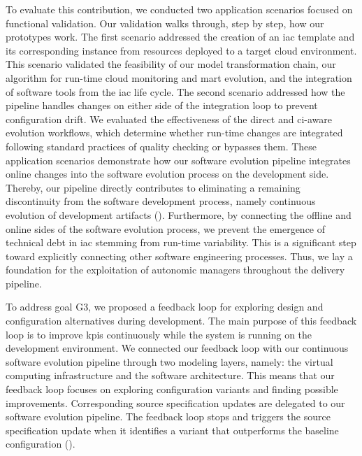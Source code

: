 \begin{description}[style=unboxed,leftmargin=0cm,font=\bfseries\normalsize]
	To evaluate this contribution, we conducted two application scenarios focused on functional validation. Our validation walks through, step by step, how our prototypes work. The first scenario addressed the creation of an \gls{iac} template and its corresponding instance from resources deployed to a target cloud environment. This scenario validated the feasibility of our model transformation chain, our algorithm for run-time cloud monitoring and \gls{mart} evolution, and the integration of software tools from the \gls{iac} life cycle. The second scenario addressed how the pipeline handles changes on either side of the integration loop to prevent configuration drift. We evaluated the effectiveness of the direct and \gls{ci}-aware evolution workflows, which determine whether run-time changes are integrated following standard practices of quality checking or bypasses them. These application scenarios demonstrate how our software evolution pipeline integrates online changes into the software evolution process on the development side. Thereby, our pipeline directly contributes to eliminating a remaining discontinuity from the software development process, namely continuous evolution of development artifacts (). Furthermore, by connecting the offline and online sides of the software evolution process, we prevent the emergence of technical debt in \gls{iac} stemming from run-time variability. This is a significant step toward explicitly connecting other software engineering processes. Thus, we lay a foundation for the exploitation of autonomic managers throughout the delivery pipeline.

	\item[\textsc{C}2: Quality-driven Self-Improvement Feedback Loop\autodot]

	To address goal \textsc{G}3, we proposed a feedback loop for exploring design and configuration alternatives during development. The main purpose of this feedback loop is to improve \glspl{kpi} continuously while the system is running on the development environment. We connected our feedback loop with our continuous software evolution pipeline through two modeling layers, namely: the virtual computing infrastructure and the software architecture. This means that our feedback loop focuses on exploring configuration variants and finding possible improvements. Corresponding source specification updates are delegated to our software evolution pipeline. The feedback loop stops and triggers the source specification update when it identifies a variant that outperforms the baseline configuration ().


\end{description}

